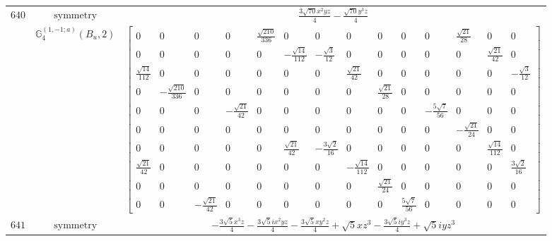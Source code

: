 \documentclass[fleqn,8pt,landscape]{jsarticle}
\begin{document}
\begin{longtable}{ccc}
$ 640 $ & $ \text{symmetry} $ & $ \frac{3 \sqrt{70} x^{2} y z}{4} - \frac{\sqrt{70} y^{3} z}{4} $ \\
$  $ & $ \mathbb{G}_{4}^{(1,-1;a)}(B_{u},2) $ & $ \begin{bmatrix} 0 & 0 & 0 & 0 & \frac{\sqrt{210}}{336} & 0 & 0 & 0 & 0 & 0 & 0 & \frac{\sqrt{21}}{28} & 0 & 0 \\ 0 & 0 & 0 & 0 & 0 & - \frac{\sqrt{14}}{112} & - \frac{\sqrt{3}}{12} & 0 & 0 & 0 & 0 & 0 & \frac{\sqrt{21}}{42} & 0 \\ \frac{\sqrt{14}}{112} & 0 & 0 & 0 & 0 & 0 & 0 & \frac{\sqrt{21}}{42} & 0 & 0 & 0 & 0 & 0 & - \frac{\sqrt{3}}{12} \\ 0 & - \frac{\sqrt{210}}{336} & 0 & 0 & 0 & 0 & 0 & 0 & \frac{\sqrt{21}}{28} & 0 & 0 & 0 & 0 & 0 \\ 0 & 0 & 0 & - \frac{\sqrt{21}}{42} & 0 & 0 & 0 & 0 & 0 & 0 & - \frac{5 \sqrt{7}}{56} & 0 & 0 & 0 \\ 0 & 0 & 0 & 0 & 0 & 0 & 0 & 0 & 0 & 0 & 0 & - \frac{\sqrt{21}}{24} & 0 & 0 \\ 0 & 0 & 0 & 0 & 0 & \frac{\sqrt{21}}{42} & - \frac{3 \sqrt{2}}{16} & 0 & 0 & 0 & 0 & 0 & \frac{\sqrt{14}}{112} & 0 \\ \frac{\sqrt{21}}{42} & 0 & 0 & 0 & 0 & 0 & 0 & - \frac{\sqrt{14}}{112} & 0 & 0 & 0 & 0 & 0 & \frac{3 \sqrt{2}}{16} \\ 0 & 0 & 0 & 0 & 0 & 0 & 0 & 0 & \frac{\sqrt{21}}{24} & 0 & 0 & 0 & 0 & 0 \\ 0 & 0 & - \frac{\sqrt{21}}{42} & 0 & 0 & 0 & 0 & 0 & 0 & \frac{5 \sqrt{7}}{56} & 0 & 0 & 0 & 0 \end{bmatrix} $ \\ \hline
$ 641 $ & $ \text{symmetry} $ & $ - \frac{3 \sqrt{5} x^{3} z}{4} - \frac{3 \sqrt{5} i x^{2} y z}{4} - \frac{3 \sqrt{5} x y^{2} z}{4} + \sqrt{5} x z^{3} - \frac{3 \sqrt{5} i y^{3} z}{4} + \sqrt{5} i y z^{3} $ \\

\end{longtable}
\end{document}
